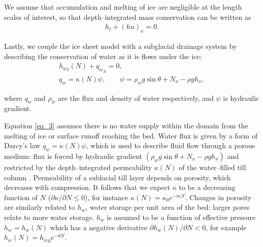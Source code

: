 \documentclass[journal abbreviation, manuscript]{copernicus}
\begin{document}
We assume that accumulation and melting of 
ice are negligible at the length scales of interest, so that 
depth--integrated mass conservation can be written as
\begin{align} \label{eq_2}
h_t + (hu)_x = 0.
\end{align}

Lastly, we couple the ice sheet model with a subglacial drainage system by describing the conservation of water as it is flows under the ice:
\begin{align} \label{eq_3}
 {h_w}_t (N) +  {q_w}_x = 0, \\
   q_w = \kappa (N) \psi , \qquad \psi = \rho_w g \sin\theta + N_x - \rho g h_x,
\end{align}

where $q_w$ and $\rho_w$ are the flux and density of water respectively, and $\psi$ is hydraulic gradient.

Equation \eqref{eq_3} assumes there is no water supply within the domain from the melting of ice or surface runoff reaching the bed.
Water flux is given by a form of Darcy's law $ q_w = \kappa (N) \psi $, which is  used to describe fluid flow through a porous medium: flux is forced by hydraulic gradient $\left( \rho_w g \sin\theta + N_x - \rho g h_x  \right)$ and restricted by the depth--integrated permeability $\kappa(N)$ of the water--filled till column   \citep[e.g.][]{bear2013dynamics, hillel2013fundamentals}. 
Permeability of a sublacial till layer depends on porosity, which decreases with compression. It follows that we expect $\kappa$ to be a decreasing 
function of $N$ ($\partial \kappa / \partial N \leq 0$), for instance $\kappa(N) = \kappa_0 e^{-mN}$.
Changes in porosity are similarly related to $h_w$, water storage per unit area of the bed: larger pores relate to more water storage. $h_w$ is assumed to be a function of effective pressure $h_w=h_w(N)$ which has a negative derivative $\partial h_w(N) / \partial N < 0$, for example $h_w(N) = {h_w}_0 e^{-dN}$. 
\end{document}
